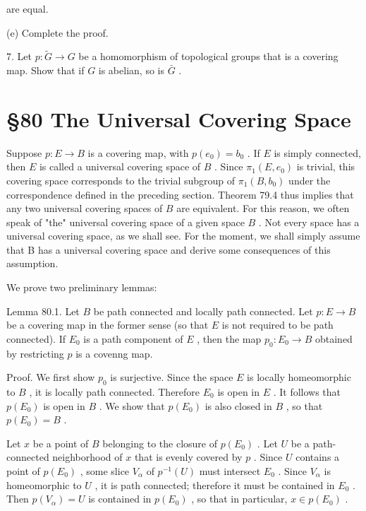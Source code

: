 are equal.

(e) Complete the proof.

7. Let \(p : \widetilde{G} \rightarrow  G\) be a homomorphism of topological groups that is a covering map. Show that if \(G\) is abelian, so is \(\bar{G}\) .

\section*{ \S 80 The Universal Covering Space}

Suppose \(p : E \rightarrow  B\) is a covering map, with \(p\left( {e}_{0}\right)  = {b}_{0}\) . If \(E\) is simply connected, then \(E\) is called a universal covering space of \(B\) . Since \({\pi }_{1}\left( {E,{e}_{0}}\right)\) is trivial, this covering space corresponds to the trivial subgroup of \({\pi }_{1}\left( {B,{b}_{0}}\right)\) under the correspondence defined in the preceding section. Theorem 79.4 thus implies that any two universal covering spaces of \(B\) are equivalent. For this reason, we often speak of "the" universal covering space of a given space \(B\) . Not every space has a universal covering space, as we shall see. For the moment, we shall simply assume that B has a universal covering space and derive some consequences of this assumption.

We prove two preliminary lemmas:

Lemma 80.1. Let \(B\) be path connected and locally path connected. Let \(p : E \rightarrow  B\) be a covering map in the former sense (so that \(E\) is not required to be path connected). If \({E}_{0}\) is a path component of \(E\) , then the map \({p}_{0} : {E}_{0} \rightarrow  B\) obtained by restricting \(p\) is a covenng map.

Proof. We first show \({p}_{0}\) is surjective. Since the space \(E\) is locally homeomorphic to \(B\) , it is locally path connected. Therefore \({E}_{0}\) is open in \(E\) . It follows that \(p\left( {E}_{0}\right)\) is open in \(B\) . We show that \(p\left( {E}_{0}\right)\) is also closed in \(B\) , so that \(p\left( {E}_{0}\right)  = B\) .

Let \(x\) be a point of \(B\) belonging to the closure of \(p\left( {E}_{0}\right)\) . Let \(U\) be a path-connected neighborhood of \(x\) that is evenly covered by \(p\) . Since \(U\) contains a point of \(p\left( {E}_{0}\right)\) , some slice \({V}_{\alpha }\) of \({p}^{-1}\left( U\right)\) must intersect \({E}_{0}\) . Since \({V}_{\alpha }\) is homeomorphic to \(U\) , it is path connected; therefore it must be contained in \({E}_{0}\) . Then \(p\left( {V}_{\alpha }\right)  = U\) is contained in \(p\left( {E}_{0}\right)\) , so that in particular, \(x \in  p\left( {E}_{0}\right)\) .

